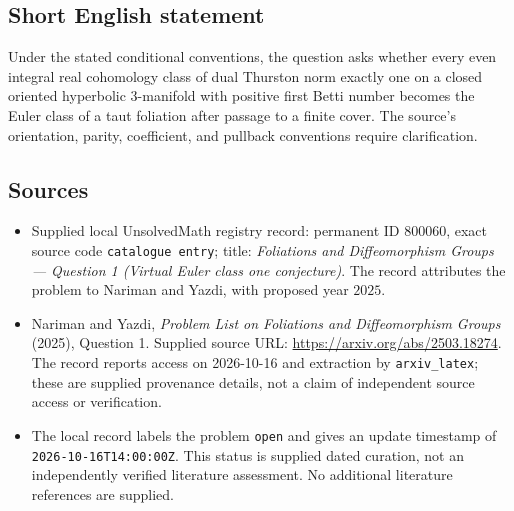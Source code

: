 \documentclass[11pt]{article}
\begin{document}
\subsection{Short English statement}
Under the stated conditional conventions, the question asks whether every even integral real cohomology class of dual Thurston norm exactly one on a closed oriented hyperbolic \(3\)-manifold with positive first Betti number becomes the Euler class of a taut foliation after passage to a finite cover. The source's orientation, parity, coefficient, and pullback conventions require clarification.
\subsection{Sources}
\begin{itemize}
\item Supplied local UnsolvedMath registry record: permanent ID \(800060\), exact source code \texttt{catalogue entry}; title: \emph{Foliations and Diffeomorphism Groups --- Question 1 (Virtual Euler class one conjecture)}. The record attributes the problem to Nariman and Yazdi, with proposed year \(2025\).
\item Nariman and Yazdi, \emph{Problem List on Foliations and Diffeomorphism Groups} (2025), Question 1. Supplied source URL: \url{https://arxiv.org/abs/2503.18274}. The record reports access on 2026-10-16 and extraction by \texttt{arxiv\_latex}; these are supplied provenance details, not a claim of independent source access or verification.
\item The local record labels the problem \texttt{open} and gives an update timestamp of \texttt{2026-10-16T14:00:00Z}. This status is supplied dated curation, not an independently verified literature assessment. No additional literature references are supplied.
\end{itemize}
\end{document}
